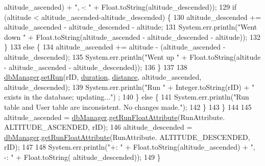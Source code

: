\begin{DoxyCode}
      altitude\_ascended) + \textcolor{stringliteral}{", -: "} + Float.toString(altitude\_descended));
129                 \textcolor{keywordflow}{if} (altitude < altitude\_ascended-altitude\_descended) \{
130                     altitude\_descended += altitude\_ascended - altitude\_descended - altitude;
131                     System.err.println(\textcolor{stringliteral}{"Went down "} + Float.toString(altitude\_ascended - altitude\_descended
       - altitude));
132                 \}
133                 \textcolor{keywordflow}{else} \{
134                     altitude\_ascended += altitude - (altitude\_ascended - altitude\_descended);
135                     System.err.println(\textcolor{stringliteral}{"Went up "} + Float.toString(altitude - altitude\_ascended - 
      altitude\_descended));
136                 \}
137 
138                 \mbox{\hyperlink{classcom_1_1activitytracker_1_1_run_ab90e32eda9f4c671ae3575f971edca6b}{dbManager}}.\mbox{\hyperlink{classcom_1_1activitytracker_1_1_d_b_manager_aa088e156858d8d661e2f43c1054c51c8}{setRun}}(rID, \mbox{\hyperlink{classcom_1_1activitytracker_1_1_run_a5e38d293d29d4b65c9290ff4bee82e03}{duration}}, \mbox{\hyperlink{classcom_1_1activitytracker_1_1_run_a7b4ca8c4ecea4da1653f03b8c8fc16a8}{distance}}, altitude\_ascended,
       altitude\_descended);
139                 System.err.println(\textcolor{stringliteral}{"Run "} + Integer.toString(rID) + \textcolor{stringliteral}{" exists in the database; updating..."})
      ;
140             \} \textcolor{keywordflow}{else} \{
141                 System.err.println(\textcolor{stringliteral}{"Run table and User table are inconsistent. No changes made."});
142             \}
143         \}
144 
145         altitude\_ascended = \mbox{\hyperlink{classcom_1_1activitytracker_1_1_run_ab90e32eda9f4c671ae3575f971edca6b}{dbManager}}.\mbox{\hyperlink{classcom_1_1activitytracker_1_1_d_b_manager_a666452f1e5862f90c06b0beb9a9fcfdd}{getRunFloatAttribute}}(RunAttribute.
      ALTITUDE\_ASCENDED, rID);
146         altitude\_descended = \mbox{\hyperlink{classcom_1_1activitytracker_1_1_run_ab90e32eda9f4c671ae3575f971edca6b}{dbManager}}.\mbox{\hyperlink{classcom_1_1activitytracker_1_1_d_b_manager_a666452f1e5862f90c06b0beb9a9fcfdd}{getRunFloatAttribute}}(RunAttribute.
      ALTITUDE\_DESCENDED, rID);
147 
148         System.err.println(\textcolor{stringliteral}{"+: "} + Float.toString(altitude\_ascended) + \textcolor{stringliteral}{", -: "} + Float.toString(
      altitude\_descended));
149     \}
\end{DoxyCode}



